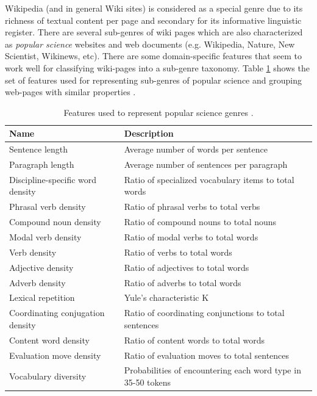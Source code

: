 Wikipedia (and in general Wiki sites) is considered as a special genre due to its richness of textual content per page and secondary for its informative linguistic register. There are several sub-genres of wiki pages which are also characterized as \textit{popular science} websites and web documents (e.g. Wikipedia, Nature, New Scientist, Wikinews, etc). There are some domain-specific features that seem to work well for classifying wiki-pages into a sub-genre taxonomy. Table \ref{chap:relevant_work:tbl:pop_science_features} shows the set of features used for representing sub-genres of popular science and grouping web-pages with similar properties \parencite{lieungnapar2017genre}. 

\begin{table}[t]
	\center
	\caption {Features used to represent popular science genres \parencite{lieungnapar2017genre}.}\label{chap:relevant_work:tbl:pop_science_features}
	\begin{tabular}{p{4cm}p{8cm}}
		\hline
		Name & Description \\
		\hline
		Sentence length & Average number of words per sentence \\
        Paragraph length & Average number of sentences per paragraph \\
        Discipline-specific word density & Ratio of specialized vocabulary items to total words \\
        Phrasal verb density & Ratio of phrasal verbs to total verbs \\
        Compound noun density & Ratio of compound nouns to total nouns \\
        Modal verb density & Ratio of modal verbs to total words \\
        Verb density &  Ratio of verbs to total words \\
        Adjective density & Ratio of adjectives to total words \\
        Adverb density & Ratio of adverbs to total words \\
        Lexical repetition & Yule's characteristic K \\
        Coordinating conjugation density & Ratio of coordinating conjunctions to total sentences \\
        Content word density & Ratio of content words to total words \\
        Evaluation move density & Ratio of evaluation moves to total sentences \\
        Vocabulary diversity & Probabilities of encountering each word type in 35-50 tokens \\

\end{tabular}
\end{table}
